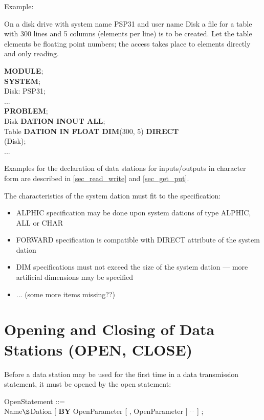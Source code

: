 Example:

On a disk drive with system name PSP31 and user name Disk a file for a
table with 300 lines and 5 columns (elements per line) is to be created.
Let the table elements be floating point numbers; the access takes place
to elements directly and only reading.

{\bf MODULE};\\

{\bf SYSTEM};\\
\x Disk: PSP31;\\
\x ... \\
\label{Example}
{\bf PROBLEM};\\
 Disk {\bf DATION INOUT  ALL};\\
 Table {\bf DATION IN FLOAT DIM}(300, 5) {\bf DIRECT}\\
\x {} (Disk);\\
\x ...

Examples for the declaration of data stations for inputs/outputs in
character form are described in 
\ref{sec_read_write} and \ref{sec_get_put}.

\begin{added}
The characteristics of the system dation must fit to the specification:
\begin{itemize}
\item ALPHIC specification may be done upon system dations of type ALPHIC,
   ALL or CHAR
\item FORWARD specification is compatible with DIRECT attribute
   of the system dation
\item DIM specifications must not exceed the size of the system dation --- 
   more artificial dimensions may be specified
\item ... (some more items missing??)
\end{itemize}
\end{added}

\section{Opening and Closing of Data Stations (OPEN, CLOSE)}   %
\label{sec_open_close}

Before a data station may be used for the first time in a data
transmission statement, it must be opened by the open statement:

OpenStatement ::=\\
 Name$\S $Dation [ {\bf BY} OpenParameter [ , OpenParameter ] $^{...}$ ] ;

